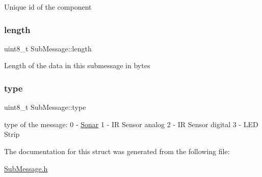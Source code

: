 Unique id of the component \mbox{\label{struct_sub_message_a276e06f5335ca7857c21ac8c0e51bd6d}} 
\subsubsection{\texorpdfstring{length}{length}}
{\footnotesize\ttfamily uint8\+\_\+t Sub\+Message\+::length}

Length of the data in this submessage in bytes \mbox{\label{struct_sub_message_a064f1d26d553da776dc749d37a18a499}} 
\subsubsection{\texorpdfstring{type}{type}}
{\footnotesize\ttfamily uint8\+\_\+t Sub\+Message\+::type}

type of the message\+: 0 -\/ \hyperlink{class_sonar}{Sonar} 1 -\/ IR Sensor analog 2 -\/ IR Sensor digital 3 -\/ L\+ED Strip 

The documentation for this struct was generated from the following file\+:\begin{DoxyCompactItemize}
\item 
\hyperlink{_sub_message_8h}{Sub\+Message.\+h}\end{DoxyCompactItemize}
